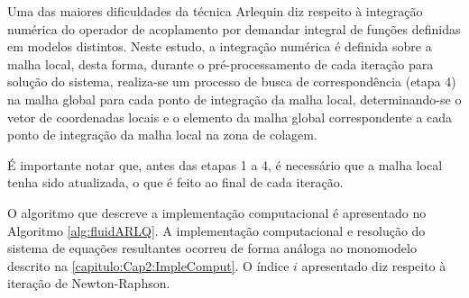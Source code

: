 Uma das maiores dificuldades da técnica Arlequin diz respeito à integração numérica do operador de acoplamento por demandar integral de funções definidas em modelos distintos. Neste estudo, a integração numérica é definida sobre a malha local, desta forma, durante o pré-processamento de cada iteração para solução do sistema, realiza-se um processo de busca de correspondência (etapa 4) na malha global para cada ponto de integração da malha local, determinando-se o vetor de coordenadas locais e o elemento da malha global correspondente a cada ponto de integração da malha local na zona de colagem.

É importante notar que, antes das etapas 1 a 4, é necessário que a malha local tenha sido atualizada, o que é feito ao final de cada iteração.

O algoritmo que descreve a implementação computacional é apresentado no Algoritmo \ref{alg:fluidARLQ}. A implementação computacional e resolução do sistema de equações resultantes ocorreu de forma análoga ao monomodelo descrito na \autoref{capitulo:Cap2:ImpleComput}. O índice $i$ apresentado diz respeito à iteração de Newton-Raphson.

